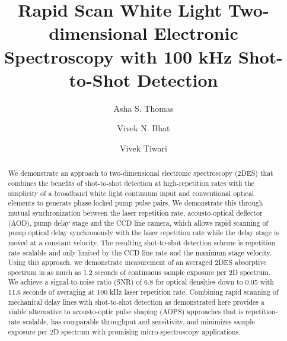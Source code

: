 \documentclass[%
aip,
amsmath,amssymb,
preprint,%
]{revtex4-2}
\newcommand*{\vt}[1]{\textcolor{black}{ #1}}
\begin{document}
\title{Rapid Scan White Light Two-dimensional Electronic Spectroscopy with 100 kHz Shot-to-Shot Detection}

\author{Asha S. Thomas}
%
\author{Vivek N. Bhat}%
%
\author{Vivek Tiwari}
%



\begin{abstract}
We demonstrate an approach to two-dimensional electronic spectroscopy (2DES) that combines the benefits of shot-to-shot detection at high-repetition rates with the simplicity of a broadband white light continuum input and  conventional optical elements to generate phase-locked pump pulse pairs. We demonstrate this through mutual synchronization between the laser repetition rate, acousto-optical deflector (AOD), pump delay stage and the CCD line camera, which allows rapid scanning of pump optical delay synchronously with the laser repetition rate while the delay stage is moved at a constant velocity. The resulting shot-to-shot detection scheme is repetition rate scalable and only limited by the CCD line rate and the \vt{maximum stage velocity}. Using this approach, we demonstrate measurement of an averaged 2DES absorptive spectrum in as much as \vt{1.2 seconds of continuous sample exposure per 2D spectrum}. We achieve a signal-to-noise ratio (SNR) of 6.8 for optical densities down to 0.05 with 11.6 seconds of averaging at 100 kHz laser repetition rate. Combining rapid scanning of mechanical delay lines with shot-to-shot detection as demonstrated here provides a viable alternative to acousto-optic pulse shaping (AOPS) approaches that is repetition-rate scalable, has comparable throughput and sensitivity, and minimizes sample exposure per 2D spectrum with promising micro-spectroscopy applications.
\end{abstract}
\end{document}
